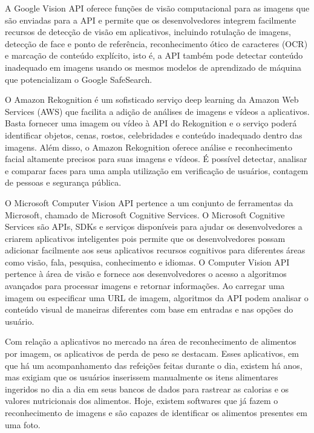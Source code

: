 A Google Vision API \cite{google_vision} oferece funções de visão computacional para as imagens que são enviadas para a API e permite que os desenvolvedores integrem facilmente recursos de detecção de visão em aplicativos, incluindo rotulação de imagens, detecção de face e ponto de referência, reconhecimento ótico de caracteres (OCR) e marcação de conteúdo explícito, isto é, a API também pode detectar conteúdo inadequado em imagens usando os mesmos modelos de aprendizado de máquina que potencializam o Google SafeSearch. 

O Amazon Rekognition \cite{amazon_rekognition} é um sofisticado serviço deep learning da Amazon Web Services (AWS) que facilita a adição de análises de imagens e vídeos a aplicativos. Basta fornecer uma imagem ou vídeo à API do Rekognition e o serviço poderá identificar objetos, cenas, rostos, celebridades e conteúdo inadequado dentro das imagens. Além disso, o Amazon Rekognition oferece análise e reconhecimento facial altamente precisos para suas imagens e vídeos. É possível detectar, analisar e comparar faces para uma ampla utilização em verificação de usuários, contagem de pessoas e segurança pública.

O Microsoft Computer Vision API \cite{azure_microsoft_computer_vision} pertence a um conjunto de ferramentas da Microsoft, chamado de Microsoft Cognitive Services. O Microsoft Cognitive Services são APIs, SDKs e serviços disponíveis para ajudar os desenvolvedores a criarem aplicativos inteligentes pois permite que os desenvolvedores possam adicionar facilmente aos seus aplicativos recursos cognitivos para diferentes áreas como visão, fala, pesquisa, conhecimento e idiomas. O Computer Vision API pertence à área de visão e fornece aos desenvolvedores o acesso a algoritmos avançados para processar imagens e retornar informações. Ao carregar uma imagem ou especificar uma URL de imagem, algoritmos da API podem analisar o conteúdo visual de maneiras diferentes com base em entradas e nas opções do usuário.

Com relação a aplicativos no mercado na área de reconhecimento de alimentos por imagem, os aplicativos de perda de peso se destacam. Esses aplicativos, em que há um acompanhamento das refeições feitas durante o dia, existem há anos, mas exigiam que os usuários inserissem manualmente os itens alimentares ingeridos no dia a dia em seus bancos de dados para rastrear as calorias e os valores nutricionais dos alimentos. Hoje, existem softwares que já fazem o reconhecimento de imagens e são capazes de identificar os alimentos presentes em uma foto.


